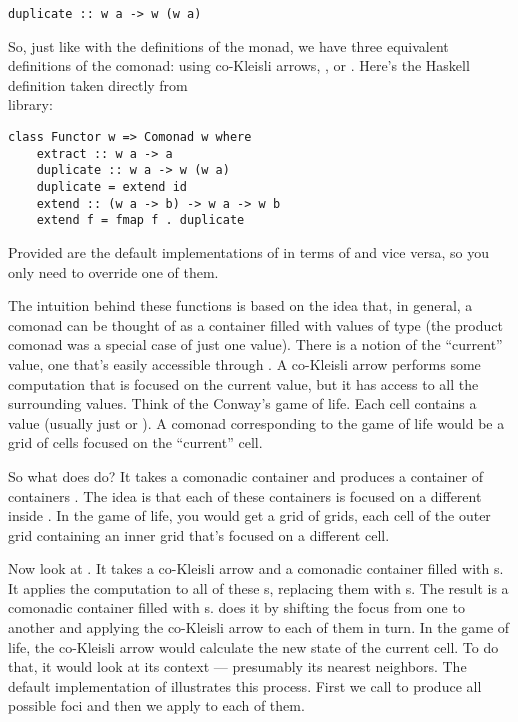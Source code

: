 \begin{Verbatim}
duplicate :: w a -> w (w a)
\end{Verbatim}
So, just like with the definitions of the monad, we have three
equivalent definitions of the comonad: using co-Kleisli arrows,
, or . Here's the Haskell definition
taken directly from\\  library:

\begin{Verbatim}
class Functor w => Comonad w where
    extract :: w a -> a
    duplicate :: w a -> w (w a)
    duplicate = extend id
    extend :: (w a -> b) -> w a -> w b
    extend f = fmap f . duplicate
\end{Verbatim}
Provided are the default implementations of  in terms of
 and vice versa, so you only need to override one of
them.

The intuition behind these functions is based on the idea that, in
general, a comonad can be thought of as a container filled with values
of type  (the product comonad was a special case of just one
value). There is a notion of the ``current'' value, one that's easily
accessible through . A co-Kleisli arrow performs some
computation that is focused on the current value, but it has access to
all the surrounding values. Think of the Conway's game of life. Each
cell contains a value (usually just  or ). A
comonad corresponding to the game of life would be a grid of cells
focused on the ``current'' cell.

So what does  do? It takes a comonadic container
 and produces a container of containers .
The idea is that each of these containers is focused on a different
 inside . In the game of life, you would get a
grid of grids, each cell of the outer grid containing an inner grid
that's focused on a different cell.

Now look at . It takes a co-Kleisli arrow and a comonadic
container  filled with s. It applies the
computation to all of these s, replacing them with
s. The result is a comonadic container filled with
s.  does it by shifting the focus from one
 to another and applying the co-Kleisli arrow to each of them
in turn. In the game of life, the co-Kleisli arrow would calculate the
new state of the current cell. To do that, it would look at its context
--- presumably its nearest neighbors. The default implementation of
 illustrates this process. First we call
 to produce all possible foci and then we apply
 to each of them.

